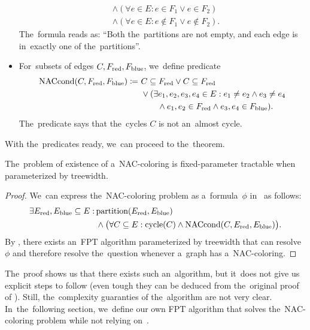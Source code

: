 \begin{itemize}
\begin{align*}
		       & \land (\forall e \in E : e \in F_1 \lor e \in F_2 )          \\
		       & \land (\forall e \in E : e \not\in F_1 \lor e \not\in F_2 ).
	      \end{align*}
	      The~formula reads as: ``Both the~partitions are not empty,
	      and each edge is in~exactly one of the~partitions''.
	\item For~subsets of edges \( C, F_{\text{red}}, F_{\text{blue}} \), we~define predicate
	      \begin{align*}
		      \text{NACcond}(C, F_{\text{red}}, F_{\text{blue}}) \coloneqq \ 
		       & C \subseteq F_{\text{red}} \lor C \subseteq F_{\text{red}}
		      \\
		       & \lor (\exists e_1, e_2, e_3, e_4 \in E :
		      e_1 \ne e_2 \land e_3 \ne e_4
		      \\
		       & \qquad \land e_1, e_2 \in F_{\text{red}} \land e_3, e_4 \in F_{\text{blue}} ).
	      \end{align*}
	      The~predicate says that the~cycles \( C \) is not an~almost cycle.
\end{itemize}
%

With the~predicates ready, we~can proceed to the~theorem.
%
\begin{theorem}
	The~problem of existence of a~NAC-coloring is fixed-parameter
	tractable when parameterized by treewidth.
\end{theorem}
%
\begin{proof}
	We~can express the~NAC-coloring problem
	as a~formula~\( \phi \) in~\MSO{} as follows:
	\begin{align*}
		\exists E_{\text{red}}, E_{\text{blue}} \subseteq E : \,
		 & \text{partition}(E_{\text{red}}, E_{\text{blue}})                                                                 \\
		 & \land \big(\forall C \subseteq E : \text{cycle}(C) \land \text{NACcond}(C, E_{\text{red}}, E_{\text{blue}}) \big)
		.
	\end{align*}
	By ,
	there exists an~FPT algorithm parameterized by treewidth
	that can resolve \( \phi \) and therefore resolve the~question whenever a~graph has a~NAC-coloring.
\end{proof}
%
The~proof shows us that there exists such an~algorithm,
but it~does not give us explicit steps to follow
(even tough they can be deduced from the~original proof of ).
Still, the~complexity guaranties of the~algorithm are not very clear.
In~the~following section, we~define our
own FPT algorithm that solves the~NAC-coloring problem
while not relying on~\MSO{}.



